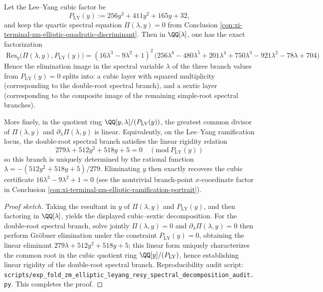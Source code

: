 \begin{conclusion}\label{con:xi-terminal-zm-leyang-resy-spectral-decomposition}
Let the Lee--Yang cubic factor be
\[
P_{\mathrm{LY}}(y):=256y^{3}+411y^{2}+165y+32,
\]
and keep the quartic spectral equation \(\Pi(\lambda,y)=0\) from Conclusion \ref{con:xi-terminal-zm-elliptic-quadratic-discriminant}.
Then in \(\QQ[\lambda]\), one has the exact factorization
\[
\boxed{\;
\mathrm{Res}_{y}\bigl(\Pi(\lambda,y),P_{\mathrm{LY}}(y)\bigr)
=(16\lambda^{3}-9\lambda^{2}+1)^{2}\,
\bigl(256\lambda^{6}-480\lambda^{5}+201\lambda^{4}+750\lambda^{3}-921\lambda^{2}-78\lambda+704\bigr)\;}
\]
Hence the elimination image in the spectral variable \(\lambda\) of the three branch values from \(P_{\mathrm{LY}}(y)=0\) splits into:
a cubic layer with squared multiplicity (corresponding to the double-root spectral branch), and a sextic layer (corresponding to the composite image of the remaining simple-root spectral branches).
\par
More finely, in the quotient ring \(\QQ[y,\lambda]/(P_{\mathrm{LY}}(y))\), the greatest common divisor of \(\Pi(\lambda,y)\) and \(\partial_{\lambda}\Pi(\lambda,y)\) is linear.
Equivalently, on the Lee--Yang ramification locus, the double-root spectral branch satisfies the linear rigidity relation
\[
\boxed{\;
279\lambda+512y^{2}+518y+5=0\quad(\mathrm{mod}\ P_{\mathrm{LY}}(y))\;}
\]
so this branch is uniquely determined by the rational function \(\lambda=-(512y^{2}+518y+5)/279\).
Eliminating \(y\) then exactly recovers the cubic certificate \(16\lambda^{3}-9\lambda^{2}+1=0\) (see the nontrivial branch-point \(x\)-coordinate factor in Conclusion \ref{con:xi-terminal-zm-elliptic-ramification-portrait}).
\end{conclusion}
\begin{proof}[Proof sketch]
Taking the resultant in \(y\) of \(\Pi(\lambda,y)\) and \(P_{\mathrm{LY}}(y)\), and then factoring in \(\QQ[\lambda]\), yields the displayed cubic--sextic decomposition.
For the double-root spectral branch, solve jointly
\(
\Pi(\lambda,y)=0
\)
and
\(
\partial_{\lambda}\Pi(\lambda,y)=0
\)
then perform Gröbner elimination under the constraint \(P_{\mathrm{LY}}(y)=0\), obtaining the linear eliminant
\(
279\lambda+512y^{2}+518y+5
\);
this linear form uniquely characterizes the common root in the cubic quotient ring \(\QQ[y]/(P_{\mathrm{LY}})\), hence establishing linear rigidity of the double-root spectral branch.
Reproducibility audit script: \texttt{scripts/exp\_fold\_zm\_elliptic\_leyang\_resy\_spectral\_decomposition\_audit.py}. This completes the proof.
\end{proof}

